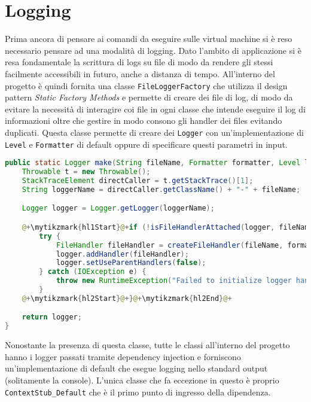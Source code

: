 \section{Logging}
Prima ancora di pensare ai comandi da eseguire sulle virtual machine si è reso necessario pensare ad una modalità di logging. Dato l'ambito di applicazione si è resa fondamentale la scrittura di logs su file di modo da rendere gli stessi facilmente accessibili in futuro, anche a distanza di tempo.\medbreak
All'interno del progetto è quindi fornita una classe \texttt{FileLoggerFactory} che utilizza il design pattern \emph{Static Factory Methods} \cite{effectiveJava} e permette di creare dei file di log, di modo da evitare la necessità di interagire coi file in ogni classe che intende eseguire il log di informazioni oltre che gestire in modo consono gli handler dei files evitando duplicati. Questa classe permette di creare dei \texttt{Logger} con un'implementazione di \texttt{Level} e \texttt{Formatter} di default oppure di specificare questi parametri in input.
\begin{lstlisting}[language=Java, caption={Metodo make di FileLoggerFactory}, label=code:FileLoggerFactoryMake]
public static Logger make(String fileName, Formatter formatter, Level level) {
    Throwable t = new Throwable();
    StackTraceElement directCaller = t.getStackTrace()[1];
    String loggerName = directCaller.getClassName() + "-" + fileName;

    Logger logger = Logger.getLogger(loggerName);

    @+\mytikzmark{hl1Start}@+if (!isFileHandlerAttached(logger, fileName)) {@+\mytikzmark{hl1End}@+
        try {
            FileHandler fileHandler = createFileHandler(fileName, formatter, level);
            logger.addHandler(fileHandler);
            logger.setUseParentHandlers(false);
        } catch (IOException e) {
            throw new RuntimeException("Failed to initialize logger handler.", e);
        }
    @+\mytikzmark{hl2Start}@+}@+\mytikzmark{hl2End}@+

    return logger;
}
    \end{lstlisting}
Nonostante la presenza di questa classe, tutte le classi all'interno del progetto hanno i logger passati tramite dependency injection e forniscono un'implementazione di default che esegue logging nello standard output (solitamente la console). L'unica classe che fa eccezione in questo è proprio \texttt{ContextStub\_Default} che è il primo punto di ingresso della dipendenza.\\
